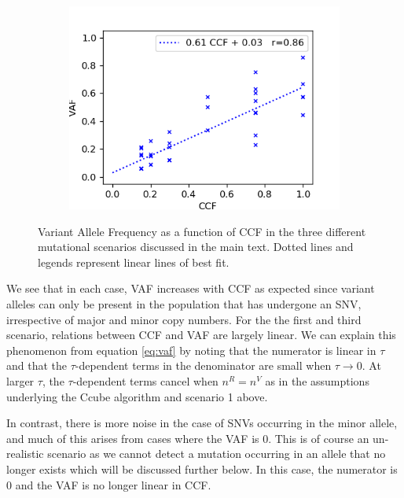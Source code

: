 \documentclass{article}
\begin{document}
\begin{figure}[h]
\begin{subfigure}[t]{0.30\linewidth}
	\end{subfigure}%
	\hspace{0.02 \linewidth}
	\begin{subfigure}[t]{0.30\linewidth}
		\centering
		\includegraphics[width = 1.0\linewidth, trim={0 0 20 20}, clip=true]{major_ccf_vaf.png}
	\end{subfigure}%
\caption{Variant Allele Frequency as a function of CCF in the three different mutational scenarios discussed in the main text. Dotted lines and legends represent linear lines of best fit.}
\label{fig:ccf_vaf}
\end{figure}

We see that in each case, VAF increases with CCF as expected since variant alleles can only be present in the population that has undergone an SNV, irrespective of major and minor copy numbers. For the the first and third scenario, relations between CCF and VAF are largely linear. We can explain this phenomenon from equation \ref{eq:vaf} by noting that the numerator is linear in $\tau$ and that the $\tau$-dependent terms in the denominator are small when $\tau \rightarrow 0$. At larger $\tau$, the $\tau$-dependent terms cancel when $n^R = n^V$ as in the assumptions underlying the Ccube algorithm and scenario 1 above.

In contrast, there is more noise in the case of SNVs occurring in the minor allele, and much of this arises from cases where the VAF is 0. This is of course an un-realistic scenario as we cannot detect a mutation occurring in an allele that no longer exists which will be discussed further below. In this case, the numerator is 0 and the VAF is no longer linear in CCF.
\end{document}
